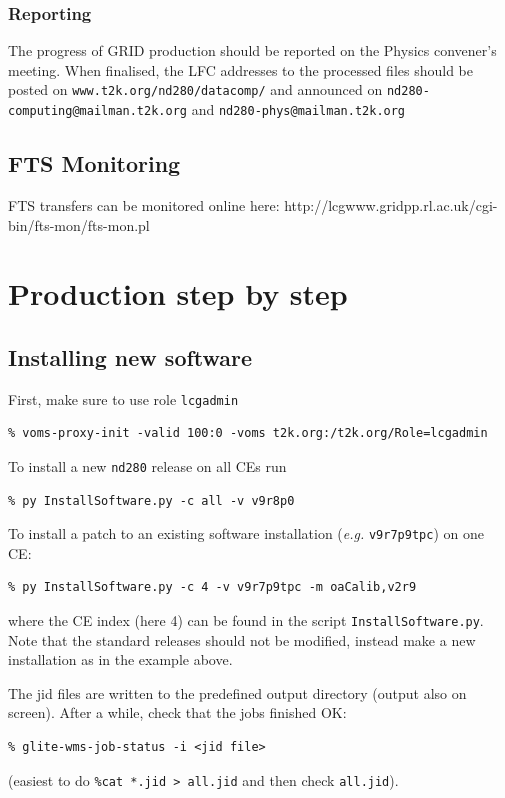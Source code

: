 \documentclass[11pt]{article}
\begin{document}
\subsubsection*{Reporting}
The progress of GRID production should be reported on the Physics convener's meeting. When finalised, the LFC addresses to the processed files should be posted on \verb+www.t2k.org/nd280/datacomp/+ and announced on \verb+nd280-computing@mailman.t2k.org+ and \verb+nd280-phys@mailman.t2k.org+

\subsection*{FTS Monitoring}
FTS transfers can be monitored online here:
http://lcgwww.gridpp.rl.ac.uk/cgi-bin/fts-mon/fts-mon.pl


\clearpage
\section{Production step by step}
\label{sec:production}

\subsection{Installing new software}

First, make sure to use role \verb+lcgadmin+
\begin{verbatim}
% voms-proxy-init -valid 100:0 -voms t2k.org:/t2k.org/Role=lcgadmin
\end{verbatim}

To install a new \verb+nd280+ release on all CEs run
\begin{verbatim}
% py InstallSoftware.py -c all -v v9r8p0
\end{verbatim}

To install a patch to an existing software installation (\textit{e.g.}
\verb+v9r7p9tpc+) on one CE:
\begin{verbatim}
% py InstallSoftware.py -c 4 -v v9r7p9tpc -m oaCalib,v2r9
\end{verbatim}
where the CE index (here 4) can be found in the script
\verb+InstallSoftware.py+. Note that the standard releases should not
be modified, instead make a new installation as in the example above.

The jid files are written to the predefined output directory (output
also on screen). After a while, check that the jobs finished OK:
\begin{verbatim}
% glite-wms-job-status -i <jid file>
\end{verbatim}
(easiest to do \verb+%cat *.jid > all.jid+ and then check \verb+all.jid+).
\end{document}
